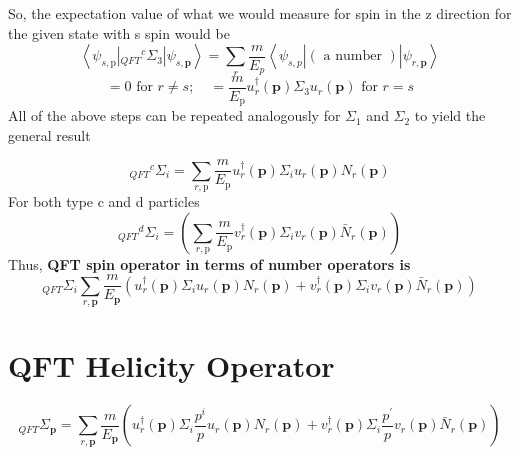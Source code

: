 So, the expectation value of what we would measure for spin in the z direction for the given state with s spin would be
$$
\left\langle\psi_{s, \mathrm{p}}\left|{}_{QFT}{}^{c} \Sigma_{3}\right| \psi_{s, \mathbf{p}}\right\rangle=\sum_{r} \frac{m}{E_{p}}\left\langle\psi_{s, p}\right|(\text { a number })\left|\psi_{r, \mathbf{p}}\right\rangle
$$
$$
=0 \text { for } r \neq s ; \quad=\frac{m}{E_{\mathrm{p}}} u_{r}^{\dagger}(\mathbf{p}) \Sigma_{3} u_{r}(\mathbf{p}) \text { for } r=s
$$
All of the above steps can be repeated analogously for $\Sigma_1$ and $\Sigma_2$ to yield the general result
\begin{qt}
\begin{equation}
{}_{QFT}{}^{c} \Sigma_{i}=\sum_{r, \mathrm{p}} \frac{m}{E_{\mathrm{p}}} u_{r}^{\dagger}(\mathbf{p}) \Sigma_{i} u_{r}(\mathbf{p}) N_{r}(\mathbf{p})
\end{equation}
For both type c and d particles
\begin{equation}
{}_{QFT}{}^{d} \Sigma_{i}=\left(\sum_{r, \mathrm{p}} \frac{m}{E_{\mathrm{p}}} v_{r}^{\dagger}(\mathbf{p}) \Sigma_{i} v_{r}(\mathbf{p}) \bar{N}_{r}(\mathbf{p})\right)
\end{equation}
Thus, \textbf{QFT spin operator in terms of number operators is}
\begin{equation}
{}_{QFT} \Sigma_{i}\sum_{r, \mathbf{p}} \frac{m}{E_{\mathbf{p}}}\left(u_{r}^{\dagger}(\mathbf{p}) \Sigma_{i} u_{r}(\mathbf{p}) N_{r}(\mathbf{p})+v_{r}^{\dagger}(\mathbf{p}) \Sigma_{i} v_{r}(\mathbf{p}) \bar{N}_{r}(\mathbf{p})\right)
\end{equation}
\end{qt}
\section{QFT Helicity Operator}
\begin{equation}
{}_{QFT} \Sigma_{\mathbf{p}}=\sum_{r, \mathbf{p}} \frac{m}{E_{\mathbf{p}}}\left(u_{r}^{\dagger}(\mathbf{p}) \Sigma_{i} \frac{p^{i}}{p} u_{r}(\mathbf{p}) N_{r}(\mathbf{p})+v_{r}^{\dagger}(\mathbf{p}) \Sigma_{i} \frac{p^{\prime}}{p} v_{r}(\mathbf{p}) \bar{N}_{r}(\mathbf{p})\right)
\end{equation}
